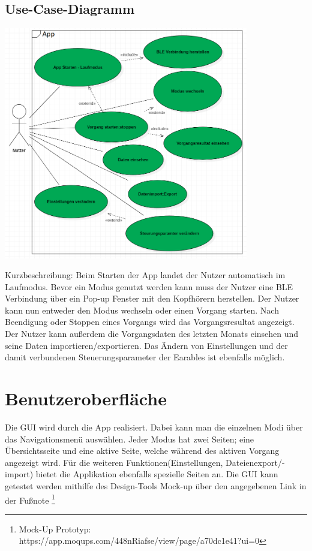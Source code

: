 \documentclass[a4paper,12pt]{article}
\begin{document}
  \subsection{Use-Case-Diagramm}
  \begin{center}
	\includegraphics[width=0.8\textwidth]{./Diagramme/Use-CaseDiagramm.png} 
  \end{center}

Kurzbeschreibung: Beim Starten der App landet der Nutzer automatisch im Laufmodus. Bevor ein Modus genutzt werden kann muss der Nutzer eine BLE Verbindung über ein Pop-up Fenster mit den Kopfhörern herstellen. Der Nutzer kann nun entweder den Modus wechseln oder einen \Gls{Vorgang} starten. Nach Beendigung oder Stoppen eines Vorgangs wird das Vorgangsresultat angezeigt. Der Nutzer kann außerdem die Vorgangsdaten des letzten Monats einsehen und seine Daten importieren/exportieren. Das Ändern von Einstellungen und der damit verbundenen \Gls{Steuerungsparameter} der \Gls{Earables} ist ebenfalls möglich.
\section{Benutzeroberfläche}
Die \Gls{GUI} wird durch die App realisiert. Dabei kann man die einzelnen Modi über das Navigationsmenü auswählen. Jeder Modus hat zwei Seiten; eine Übersichtsseite und eine aktive Seite, welche während des aktiven \Gls{Vorgang} angezeigt wird. Für die weiteren Funktionen(Einstellungen, Dateienexport/-import) bietet die Applikation ebenfalls spezielle Seiten an.
Die \Gls{GUI} kann getestet werden mithilfe des Design-Tools \glqq Mock-up\grqq{} über den angegebenen Link in der Fußnote \footnote[1]{Mock-Up Prototyp: https://app.moqups.com/448nRiafse/view/page/a70dc1e41?ui=0}
\end{document}
